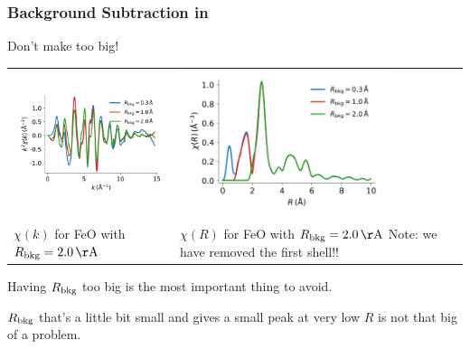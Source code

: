 \begin{frame} \frametitle{Background Subtraction in {\xasviewer}  }


  \begin{cenpage}{130mm}

    
Don't make  too big!

\begin{tabular}{ll}
  \begin{minipage}{65mm}
    \includegraphics[width=60mm]{figs/experiment/bkg_ksp2}
  \end{minipage} &
  \begin{minipage}{55mm}
    \includegraphics[width=60mm]{figs/experiment/bkg_rsp2}
  \end{minipage} \\
  \begin{minipage}{55mm}
    $\chi(k)$ for FeO with $R_{\rm bkg}=2.0\, \rm \AA$
  \end{minipage} &
  \begin{minipage}{55mm}
    $\chi(R)$ for FeO with $R_{\rm bkg}=2.0\, \rm \AA$  Note: we have
    removed the first shell!!

  \end{minipage} \\
\end{tabular}

\vmm

    \vmm
    Having $R_{\rm bkg}$ too big is the most important thing to avoid.
    
    \vmm

    $R_{\rm bkg}$  that's a little bit small  and gives a small peak at
    very low $R$ is not that big of a problem.

    \end{cenpage}
\vfill


\end{frame}


